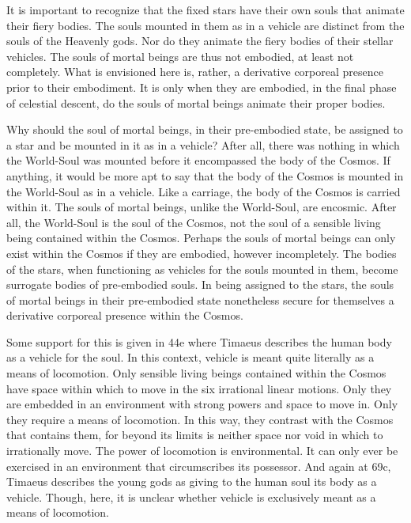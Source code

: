 It is important to recognize that the fixed stars have their own souls that animate their fiery bodies. The souls mounted in them as in a vehicle are distinct from the souls of the Heavenly gods. Nor do they animate the fiery bodies of their stellar vehicles. The souls of mortal beings are thus not embodied, at least not completely. What is envisioned here is, rather, a derivative corporeal presence prior to their embodiment. It is only when they are embodied, in the final phase of celestial descent, do the souls of mortal beings animate their proper bodies.

Why should the soul of mortal beings, in their pre-embodied state, be assigned to a star and be mounted in it as in a vehicle? After all, there was nothing in which the World-Soul was mounted before it encompassed the body of the Cosmos. If anything, it would be more apt to say that the body of the Cosmos is mounted in the World-Soul as in a vehicle. Like a carriage, the body of the Cosmos is carried within it. The souls of mortal beings, unlike the World-Soul, are encosmic. After all, the World-Soul is the soul of the Cosmos, not the soul of a sensible living being contained within the Cosmos. Perhaps the souls of mortal beings can only exist within the Cosmos if they are embodied, however incompletely. The bodies of the stars, when functioning as vehicles for the souls mounted in them, become surrogate bodies of pre-embodied souls. In being assigned to the stars, the souls of mortal beings in their pre-embodied state nonetheless secure for themselves a derivative corporeal presence within the Cosmos. 

Some support for this is given in 44e where Timaeus describes the human body as a vehicle for the soul. In this context, vehicle is meant quite literally as a means of locomotion. Only sensible living beings contained within the Cosmos have space within which to move in the six irrational linear motions. Only they are embedded in an environment with strong powers and space to move in. Only they require a means of locomotion. In this way, they contrast with the Cosmos that contains them, for beyond its limits is neither space nor void in which to irrationally move. The power of locomotion is environmental. It can only ever be exercised in an environment that circumscribes its possessor. And again at 69c, Timaeus describes the young gods as giving to the human soul its body as a vehicle. Though, here, it is unclear whether vehicle is exclusively meant as a means of locomotion.

